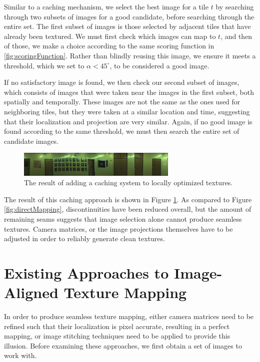 \documentclass[10pt,twocolumn,letterpaper]{article}
\begin{document}
Similar to a caching mechanism, we select the best image for a tile
$t$ by searching through two subsets of images for a good candidate,
before searching through the entire set. The first subset of images is
those selected by adjacent tiles that have already been textured. We
must first check which images can map to $t$, and then of those, we
make a choice according to the same scoring function in
\ref{fig:scoringFunction}. Rather than blindly reusing this image, we
ensure it meets a threshold, which we set to $\alpha < 45^\circ$, to
be considered a good image.

If no satisfactory image is found, we then check our second subset of
images, which consists of images that were taken near the images in
the first subset, both spatially and temporally. These images are not
the same as the ones used for neighboring tiles, but they were taken
at a similar location and time, suggesting that their localization and
projection are very similar. Again, if no good image is found
according to the same threshold, we must then search the entire set of
candidate images.

\begin{figure}
  \centering
  \includegraphics[width=3in]{wall1_cache_full.jpg}
  \caption{The result of adding a caching system to locally optimized
    textures.}
  \label{fig:caching}
\end{figure}


The result of this caching approach is shown in Figure
\ref{fig:caching}. As compared to Figure \ref{fig:directMapping},
discontinuities have been reduced overall, but the amount of remaining
seams suggests that image selection alone cannot produce seamless
textures. Camera matrices, or the image projections themselves have to
be adjusted in order to reliably generate clean textures.

\section{Existing Approaches to Image-Aligned Texture Mapping}
\label{sec:existingApproaches}
In order to produce seamless texture mapping, either camera matrices
need to be refined such that their localization is pixel accurate,
resulting in a perfect mapping, or image stitching techniques need to
be applied to provide this illusion. Before examining these
approaches, we first obtain a set of images to work with.
\end{document}

